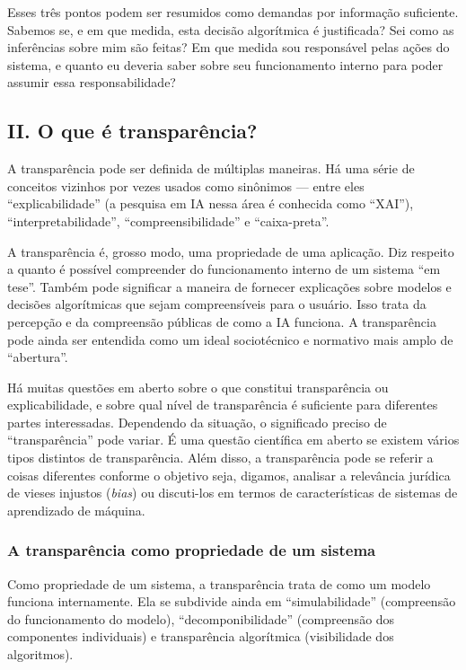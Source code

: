 \documentclass[
  11pt,
]{article}
\begin{document}
Esses três pontos podem ser resumidos como demandas por informação
suficiente. Sabemos se, e em que medida, esta decisão algorítmica é
justificada? Sei como as inferências sobre mim são feitas? Em que medida
sou responsável pelas ações do sistema, e quanto eu deveria saber sobre
seu funcionamento interno para poder assumir essa responsabilidade?

\subsection{II. O que é
transparência?}\label{ii.-o-que-uxe9-transparuxeancia}

A transparência pode ser definida de múltiplas maneiras. Há uma série de
conceitos vizinhos por vezes usados como sinônimos --- entre eles
``explicabilidade'' (a pesquisa em IA nessa área é conhecida como
``XAI''), ``interpretabilidade'', ``compreensibilidade'' e
``caixa-preta''.

A transparência é, grosso modo, uma propriedade de uma aplicação. Diz
respeito a quanto é possível compreender do funcionamento interno de um
sistema ``em tese''. Também pode significar a maneira de fornecer
explicações sobre modelos e decisões algorítmicas que sejam
compreensíveis para o usuário. Isso trata da percepção e da compreensão
públicas de como a IA funciona. A transparência pode ainda ser entendida
como um ideal sociotécnico e normativo mais amplo de ``abertura''.

Há muitas questões em aberto sobre o que constitui transparência ou
explicabilidade, e sobre qual nível de transparência é suficiente para
diferentes partes interessadas. Dependendo da situação, o significado
preciso de ``transparência'' pode variar. É uma questão científica em
aberto se existem vários tipos distintos de transparência. Além disso, a
transparência pode se referir a coisas diferentes conforme o objetivo
seja, digamos, analisar a relevância jurídica de vieses injustos
(\emph{bias}) ou discuti-los em termos de características de sistemas de
aprendizado de máquina.

\subsubsection{A transparência como propriedade de um
sistema}\label{a-transparuxeancia-como-propriedade-de-um-sistema}

Como propriedade de um sistema, a transparência trata de como um modelo
funciona internamente. Ela se subdivide ainda em ``simulabilidade''
(compreensão do funcionamento do modelo), ``decomponibilidade''
(compreensão dos componentes individuais) e transparência algorítmica
(visibilidade dos algoritmos).
\end{document}
